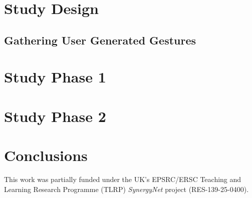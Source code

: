 \documentclass[manuscript, review, screen]{acmart}
\begin{document}
\section{Study Design} 
\label{sec:studydesign}



\subsection{Gathering User Generated Gestures} 
\label{sec:gatheringgestures}



\section{Study Phase 1} 
\label{sec:studyphase1}





\section{Study Phase 2} 
\label{sec:studyphase2}




\section{Conclusions}
\label{sec:conclusions}



\begin{acks}

This work was partially funded under the UK's EPSRC/ERSC Teaching and Learning Research Programme (TLRP) {\emph{SynergyNet}} project (RES-139-25-0400).


\end{acks}



\end{document}
